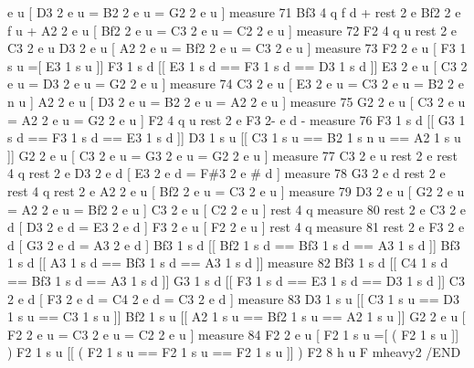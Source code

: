 e u \mbox{[} D3 2 e u = B2 2 e u = G2 2 e u \mbox{]} measure 71 Bf3 4 q f d + rest 2 e Bf2 2 e f u + A2 2 e u \mbox{[} Bf2 2 e u = C3 2 e u = C2 2 e u \mbox{]} measure 72 F2 4 q u rest 2 e C3 2 e u D3 2 e u \mbox{[} A2 2 e u = Bf2 2 e u = C3 2 e u \mbox{]} measure 73 F2 2 e u \mbox{[} F3 1 s u =\mbox{[} E3 1 s u \mbox{]}\mbox{]} F3 1 s d \mbox{[}\mbox{[} E3 1 s d == F3 1 s d == D3 1 s d \mbox{]}\mbox{]} E3 2 e u \mbox{[} C3 2 e u = D3 2 e u = G2 2 e u \mbox{]} measure 74 C3 2 e u \mbox{[} E3 2 e u = C3 2 e u = B2 2 e n u \mbox{]} A2 2 e u \mbox{[} D3 2 e u = B2 2 e u = A2 2 e u \mbox{]} measure 75 G2 2 e u \mbox{[} C3 2 e u = A2 2 e u = G2 2 e u \mbox{]} F2 4 q u rest 2 e F3 2-\/ e d -\/ measure 76 F3 1 s d \mbox{[}\mbox{[} G3 1 s d == F3 1 s d == E3 1 s d \mbox{]}\mbox{]} D3 1 s u \mbox{[}\mbox{[} C3 1 s u == B2 1 s n u == A2 1 s u \mbox{]}\mbox{]} G2 2 e u \mbox{[} C3 2 e u = G3 2 e u = G2 2 e u \mbox{]} measure 77 C3 2 e u rest 2 e rest 4 q rest 2 e D3 2 e d \mbox{[} E3 2 e d = F\#3 2 e \# d \mbox{]} measure 78 G3 2 e d rest 2 e rest 4 q rest 2 e A2 2 e u \mbox{[} Bf2 2 e u = C3 2 e u \mbox{]} measure 79 D3 2 e u \mbox{[} G2 2 e u = A2 2 e u = Bf2 2 e u \mbox{]} C3 2 e u \mbox{[} C2 2 e u \mbox{]} rest 4 q measure 80 rest 2 e C3 2 e d \mbox{[} D3 2 e d = E3 2 e d \mbox{]} F3 2 e u \mbox{[} F2 2 e u \mbox{]} rest 4 q measure 81 rest 2 e F3 2 e d \mbox{[} G3 2 e d = A3 2 e d \mbox{]} Bf3 1 s d \mbox{[}\mbox{[} Bf2 1 s d == Bf3 1 s d == A3 1 s d \mbox{]}\mbox{]} Bf3 1 s d \mbox{[}\mbox{[} A3 1 s d == Bf3 1 s d == A3 1 s d \mbox{]}\mbox{]} measure 82 Bf3 1 s d \mbox{[}\mbox{[} C4 1 s d == Bf3 1 s d == A3 1 s d \mbox{]}\mbox{]} G3 1 s d \mbox{[}\mbox{[} F3 1 s d == E3 1 s d == D3 1 s d \mbox{]}\mbox{]} C3 2 e d \mbox{[} F3 2 e d = C4 2 e d = C3 2 e d \mbox{]} measure 83 D3 1 s u \mbox{[}\mbox{[} C3 1 s u == D3 1 s u == C3 1 s u \mbox{]}\mbox{]} Bf2 1 s u \mbox{[}\mbox{[} A2 1 s u == Bf2 1 s u == A2 1 s u \mbox{]}\mbox{]} G2 2 e u \mbox{[} F2 2 e u = C3 2 e u = C2 2 e u \mbox{]} measure 84 F2 2 e u \mbox{[} F2 1 s u =\mbox{[} ( F2 1 s u \mbox{]}\mbox{]} ) F2 1 s u \mbox{[}\mbox{[} ( F2 1 s u == F2 1 s u == F2 1 s u \mbox{]}\mbox{]} ) F2 8 h u F mheavy2 /\+E\+ND 